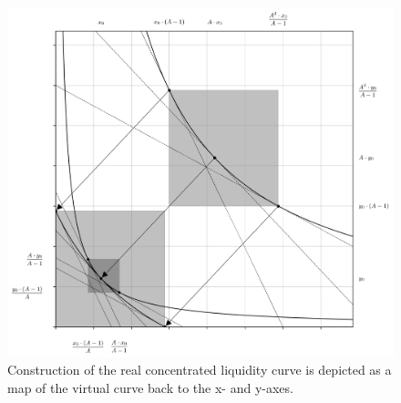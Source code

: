 \documentclass{article}
\begin{document}
\begin{figure}[ht]
    \centering
    \includegraphics[width=\textwidth]{fig16.png}
    \captionsetup{
        justification=raggedright,
        singlelinecheck=false,
        font=small,
        labelfont=bf,
        labelsep=quad,
        format=plain
    }
    \caption{Construction of the real concentrated liquidity curve is depicted as a map of the virtual curve back to the x- and y-axes.}
    \label{fig16}
\end{figure}
\end{document}
